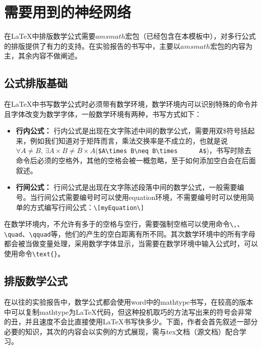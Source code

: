 \chapter{需要用到的神经网络}
在\LaTeX 中排版数学公式需要$amsmath$宏包（已经包含在本模板中），对多行公式的排版提供了有力的支持。在实验报告的书写中，主要以$amsmath$宏包的内容为主，其余内容不做阐述。
\section{公式排版基础}
在\LaTeX 中书写数学公式时必须带有数学环境，数学环境内可以识别特殊的命令并且字体改变为数学字体，一般数学环境有两种，书写方式如下：
\begin{itemize}
\item \textbf{行内公式：} 行内公式是出现在文字陈述中间的数学公式，需要用双\$符号括起来，例如我们知道对于矩阵而言，乘法交换率是不成立的，也就是说\\$\forall A\neq B,\, \exists A\times B\neq B\times      A$(\verb|$A\times B\neq B\times      A$|)，书写时除去命令后必须的空格外，其他的空格会被一概忽略，至于如何添加空白会在后面叙述。
\item \textbf{行间公式：} 行间公式是出现在文字陈述段落中间的数学公式，一般需要编号。当行间公式需要编号时可以使用equation环境，不需要编号时可以使用简单的方式编写行间公式：\verb|\[myEquation\]|
\end{itemize}

在数学环境内，不允许有多于的空格与空行，需要强制空格可以使用命令\verb|\,|、\verb|\quad|、\verb|\qquad|等，他们的产生的空白距离有所不同。其次数学环境中的所有字母都会被当做变量处理，采用数学字体显示，当需要在数学环境中输入公式时，可以使用命令\verb|\text{}|。
\section{排版数学公式}
在以往的实验报告中，数学公式都会使用word中的mathtype书写，在较高的版本中可以复制mathtype为\LaTeX 代码，但这种投机取巧的方法写出来的符号会非常的丑，并且速度不会比直接使用\LaTeX 书写快多少。下面，作者会首先叙述一部分必要的知识，其次的内容会以实例的方式展现，需与tex文档（源文档）配合学习。

